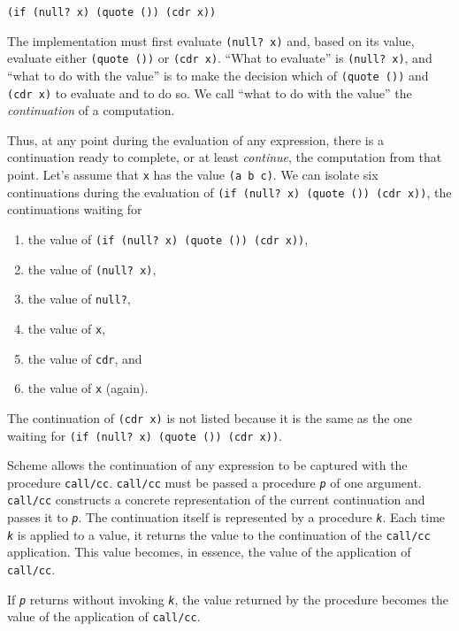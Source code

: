 \texttt{(if (null? x) (quote ()) (cdr x))}

The implementation must first evaluate \texttt{(null? x)} and, based on its value,
evaluate either \texttt{(quote ())} or \texttt{(cdr x)}.
``What to evaluate'' is \texttt{(null? x)}, and ``what to do with the value''
is to make the decision which of \texttt{(quote ())} and \texttt{(cdr x)} to
evaluate and to do so.
We call ``what to do with the value'' the \textit{continuation} of a
computation.


Thus, at any point during the evaluation of any expression, there is a
continuation ready to complete, or at least \textit{continue}, the computation
from that point.
Let's assume that \texttt{x} has the value \texttt{(a b c)}.
We can isolate six continuations during the evaluation of
\texttt{(if (null? x) (quote ()) (cdr x))}, the continuations waiting for

\begin{enumerate}
\label{further_g64}\item 
the value of \texttt{(if (null? x) (quote ()) (cdr x))},
\label{further_g65}\item the value of \texttt{(null? x)},
\label{further_g66}\item the value of \texttt{null?},
\label{further_g67}\item the value of \texttt{x},
\label{further_g68}\item the value of \texttt{cdr}, and
\label{further_g69}\item the value of \texttt{x} (again).

\end{enumerate}


The continuation of \texttt{(cdr x)} is not listed because it is the same
as the one waiting for \texttt{(if (null? x) (quote ()) (cdr x))}.


Scheme allows the continuation of any expression to be captured with
the procedure
\label{further_s62}\texttt{call/cc}.
\texttt{call/cc} must be passed a procedure \texttt{\textit{p}} of
one argument.
\texttt{call/cc} constructs a concrete representation of the
current continuation and passes it to \texttt{\textit{p}}.
The continuation itself is represented by a procedure \texttt{\textit{k}}.
Each time \texttt{\textit{k}} is applied to a value, it returns
the value to the continuation of the \texttt{call/cc} application.
This value becomes, in essence, the value of the application of
\texttt{call/cc}.


If \texttt{\textit{p}} returns without invoking \texttt{\textit{k}},
the value returned by the procedure becomes the value of the
application of \texttt{call/cc}.


